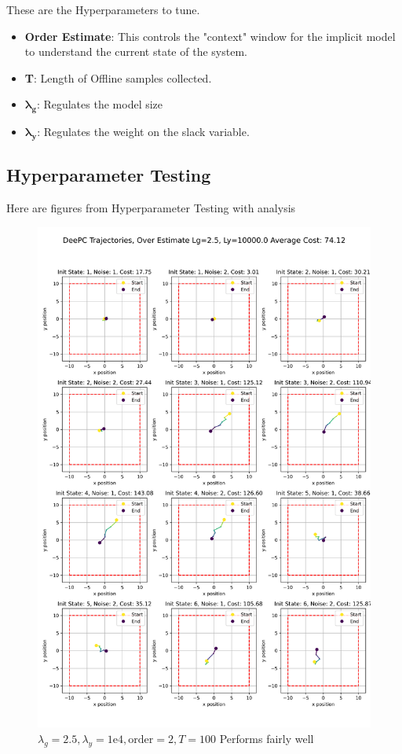 \documentclass[11pt,a4paper]{article}
\begin{document}
These are the Hyperparameters to tune.
\begin{itemize}
    \item \textbf{Order Estimate}: This controls the "context" window for the implicit model to understand the current state of the system.
    \item \textbf{T}: Length of Offline samples collected.
    \item \( \mathbf{\lambda_g} \): Regulates the model size
    \item \( \mathbf{\lambda_y} \): Regulates the weight on the slack variable.
\end{itemize}


\subsection{Hyperparameter Testing}
Here are figures from Hyperparameter Testing with analysis


\begin{figure}
    \centering
    \includegraphics[width=0.85\linewidth]{./figures/DeePC_trajectories_2.5_10000.0.png}
    \caption{$\lambda_g=2.5, \lambda_y=1\mathrm{e}4, \text{order}=2, T=100$ Performs fairly well}
    \label{fig:enter-label}
\end{figure}
\end{document}
